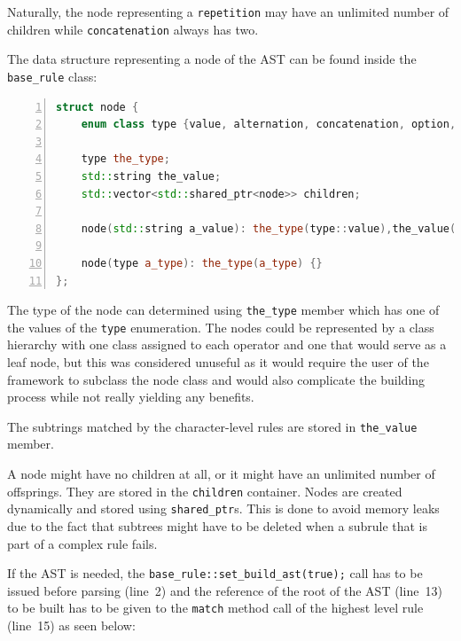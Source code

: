 \documentclass[12pt]{article}
\begin{document}
Naturally, the node representing a \texttt{repetition} may have an unlimited number of children while
\texttt{concatenation} always has two.

The data structure representing a node of the AST can be found inside the \texttt{base\_rule} class:
\begin{center}
	\begin{minipage}[h]{0.9\textwidth}
		\begin{lstlisting}[language=C++, breaklines=true, numbers=left]
struct node {
	enum class type {value, alternation, concatenation, option, repetition, repetition_or_epsilon};

	type the_type;
	std::string the_value;
	std::vector<std::shared_ptr<node>> children;

	node(std::string a_value): the_type(type::value),the_value(a_value) {}

	node(type a_type): the_type(a_type) {}
};
		\end{lstlisting}
	\end{minipage}
\end{center}

The type of the node can determined using \texttt{the\_type} member which has one of the values of the
\texttt{type} enumeration. The nodes could be represented by a class hierarchy with one class assigned to each
operator and one that would serve as a leaf node, but this was considered unuseful as it would require the
user of the framework to subclass the node class and would also complicate the building process while not
really yielding any benefits.

The subtrings matched by the character-level rules are stored in \texttt{the\_value} member.

A node might have no children at all, or it might have an unlimited number of offsprings. They are stored in
the \texttt{children} container. Nodes are created dynamically and stored using \texttt{shared\_ptr}s. This is
done to avoid memory leaks due to the fact that subtrees might have to be deleted when a subrule that is part
of a complex rule fails.

If the AST is needed, the \texttt{base\_rule::set\_build\_ast(true);} call has to be issued before parsing
(line~2) and the reference of the root of the AST (line~13) to be built has to be given to the \texttt{match}
method call of the highest level rule (line~15) as seen below:
\end{document}
